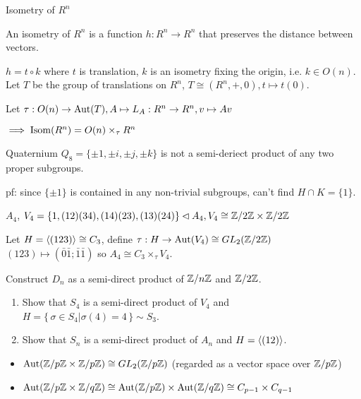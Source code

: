 \begin{example}
Isometry of $R^n$
\end{example}

\begin{definition}[Isometry]
An isometry of $R^n$ is a function $h: R^n \to R^n$ that preserves the distance between vectors.
\end{definition}
$h = t \circ k$ where $t$ is translation, $k$ is an isometry fixing the origin, i.e. $k \in O(n)$.
Let $T$ be the group of translations on $R^n$, $T \cong (R^n, +, 0), t \mapsto t(0)$.

Let $\tau : O(n) \to \operatorname{Aut}(T), A \mapsto L_A : R^n \to R^n, v \mapsto Av$

$\implies \operatorname{Isom}(R^n) = O(n) \times_\tau R^n$

\begin{example}
Quaternium $Q_8 = \{\pm 1, \pm i, \pm j, \pm k\}$ is not a semi-deriect product of any two proper subgroups.
\end{example}
pf: since $\{\pm 1\}$ is contained in any non-trivial subgroups, can't find $H \cap K = \{1\}$.

\begin{example}
  $A_4$, $V_4 = \{1, (12)(34), (14)(23), (13)(24)\} \lhd A_4, V_4 \cong {\mathbb{Z}}/{2\mathbb{Z}} \times {\mathbb{Z}}/{2\mathbb{Z}}$
\end{example}
Let $H = \langle(123)\rangle \cong C_3$, define $\tau : H \to \operatorname{Aut}(V_4) \cong GL_2({\mathbb{Z}}/{2\mathbb{Z}})$
$(123) \mapsto (\bar{0} \bar{1}; \bar{1} \bar{1})$
so $A_4 \cong C_3 \times_\tau V_4$.

\begin{exercise}
  Construct $D_n$ as a semi-direct product of ${\mathbb{Z}}/{n\mathbb{Z}}$ and
  ${\mathbb{Z}}/{2\mathbb{Z}}$.
\end{exercise}

\begin{exercise} \mbox{}
  \begin{enumerate}
    \item Show that $S_4$ is a semi-direct product of $V_4$ and $H = \{\, \sigma \in S_4 | \sigma(4) = 4 \,\} \sim S_3$.
    \item Show that $S_n$ is a semi-direct product of $A_n$ and $H = \langle(12)\rangle$.
  \end{enumerate}
\end{exercise}

\begin{remark} \mbox{}
  \begin{itemize}
    \item $\operatorname{Aut}({\mathbb{Z}}/{p\mathbb{Z}} \times {\mathbb{Z}}/{p\mathbb{Z}}) \cong GL_2({\mathbb{Z}}/{p\mathbb{Z}})$
      (regarded as a vector space over ${\mathbb{Z}}/{p\mathbb{Z}}$)
    \item $\operatorname{Aut}({\mathbb{Z}}/{p\mathbb{Z}} \times {\mathbb{Z}}/{q\mathbb{Z}}) \cong
      \operatorname{Aut}({\mathbb{Z}}/{p\mathbb{Z}}) \times \operatorname{Aut}({\mathbb{Z}}/{q\mathbb{Z}}) \cong
      C_{p-1} \times C_{q-1}$
  \end{itemize}
\end{remark}
